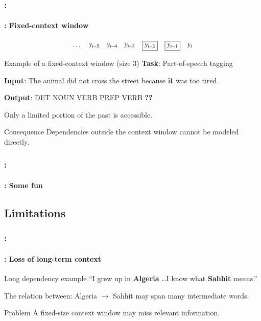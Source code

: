 \documentclass[xcolor=table]{beamer}
\begin{document}
\begin{frame}
	\frametitle{\insertshortsubtitle: \insertsection}
	\framesubtitle{\insertsubsection: Fixed-context window}
	
	\begin{center}
		
		\[
		\dots \quad y_{t-5} \quad y_{t-4} \quad y_{t-3}
		\quad
		\fbox{$y_{t-2}$}
		\quad
		\fbox{$y_{t-1}$}
		\quad
		y_t
		\]
		
	\end{center}
	
	\begin{exampleblock}{Example of a fixed-context window (size 3)}
		\textbf{Task}: Part-of-speech tagging
		
		\textbf{Input}: The animal did not cross the street because \textbf{it} was too tired.
		
		\textbf{Output}: DET NOUN VERB PREP VERB 
		   \textbf{??}
	\end{exampleblock}
	
	Only a limited portion of the past is accessible.
	
	\begin{block}{Consequence}
		Dependencies outside the context window cannot be modeled directly.
	\end{block}
	
\end{frame}

\begin{frame}
	\frametitle{\insertshortsubtitle: \insertsection}
	\framesubtitle{\insertsubsection: Some fun}
	
	\begin{center}
	\end{center}
	
\end{frame}

\subsection{Limitations}

\begin{frame}
	\frametitle{\insertshortsubtitle: \insertsection}
	\framesubtitle{\insertsubsection: Loss of long-term context}
	
	\begin{exampleblock}{Long dependency example}
		``I grew up in \textbf{Algeria} \dots I know what \textbf{Sahhit} means.''
	\end{exampleblock}
	
	
	The relation between: Algeria $\rightarrow$ Sahhit may span many intermediate words.
	
	
	\begin{alertblock}{Problem}
		A fixed-size context window may miss relevant information.
	\end{alertblock}
	
\end{frame}
\end{document}
